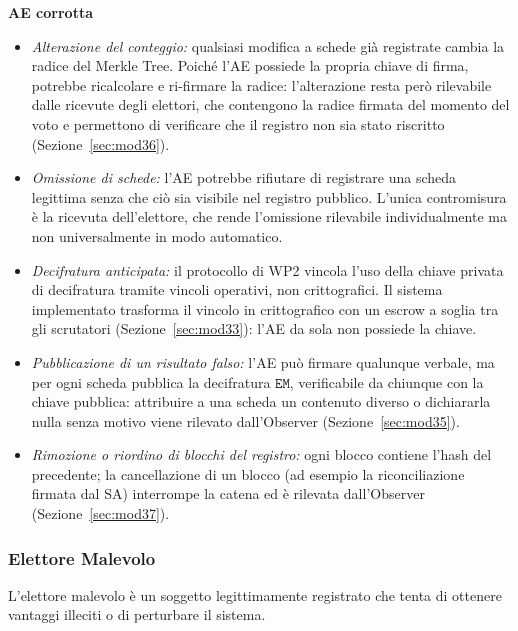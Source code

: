 \documentclass[12pt,a4paper]{article}
\begin{document}
\textbf{AE corrotta}
\begin{itemize}
  \item \textit{Alterazione del conteggio:} qualsiasi modifica a schede già registrate cambia la radice del Merkle Tree. Poiché l'AE possiede la propria chiave di firma, potrebbe ricalcolare e ri-firmare la radice: l'alterazione resta però rilevabile dalle ricevute degli elettori, che contengono la radice firmata del momento del voto e permettono di verificare che il registro non sia stato riscritto (Sezione~\ref{sec:mod36}).
  \item \textit{Omissione di schede:} l'AE potrebbe rifiutare di registrare una scheda legittima senza che ciò sia visibile nel registro pubblico. L'unica contromisura è la ricevuta dell'elettore, che rende l'omissione rilevabile individualmente ma non universalmente in modo automatico.
  \item \textit{Decifratura anticipata:} il protocollo di WP2 vincola l'uso della chiave privata di decifratura tramite vincoli operativi, non crittografici. Il sistema implementato trasforma il vincolo in crittografico con un escrow a soglia tra gli scrutatori (Sezione~\ref{sec:mod33}): l'AE da sola non possiede la chiave.
  \item \textit{Pubblicazione di un risultato falso:} l'AE può firmare qualunque verbale, ma per ogni scheda pubblica la decifratura $\mathtt{EM}$, verificabile da chiunque con la chiave pubblica: attribuire a una scheda un contenuto diverso o dichiararla nulla senza motivo viene rilevato dall'Observer (Sezione~\ref{sec:mod35}).
  \item \textit{Rimozione o riordino di blocchi del registro:} ogni blocco contiene l'hash del precedente; la cancellazione di un blocco (ad esempio la riconciliazione firmata dal SA) interrompe la catena ed è rilevata dall'Observer (Sezione~\ref{sec:mod37}).
\end{itemize}

\subsubsection{Elettore Malevolo}

L'elettore malevolo è un soggetto legittimamente registrato che tenta di ottenere vantaggi illeciti o di perturbare il sistema.
\end{document}
